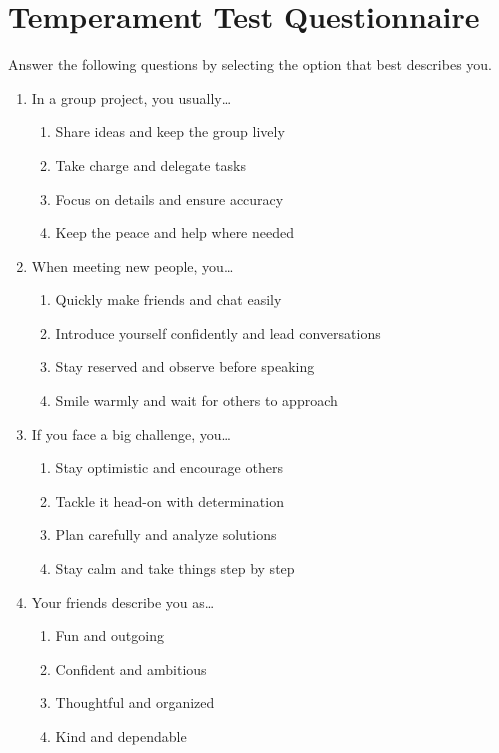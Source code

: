 \documentclass[12pt]{article}
\begin{document}
\section*{Temperament Test Questionnaire}

Answer the following questions by selecting the option that best describes you.

\begin{enumerate}[label=\textbf{Q\arabic*.}]

\item In a group project, you usually…
\begin{enumerate}[label=(\Alph*)]
\item Share ideas and keep the group lively
\item Take charge and delegate tasks
\item Focus on details and ensure accuracy
\item Keep the peace and help where needed
\end{enumerate}

\item When meeting new people, you…
\begin{enumerate}[label=(\Alph*)]
\item Quickly make friends and chat easily
\item Introduce yourself confidently and lead conversations
\item Stay reserved and observe before speaking
\item Smile warmly and wait for others to approach
\end{enumerate}

\item If you face a big challenge, you…
\begin{enumerate}[label=(\Alph*)]
\item Stay optimistic and encourage others
\item Tackle it head-on with determination
\item Plan carefully and analyze solutions
\item Stay calm and take things step by step
\end{enumerate}

\item Your friends describe you as…
\begin{enumerate}[label=(\Alph*)]
\item Fun and outgoing
\item Confident and ambitious
\item Thoughtful and organized
\item Kind and dependable
\end{enumerate}


\end{enumerate}
\end{document}
